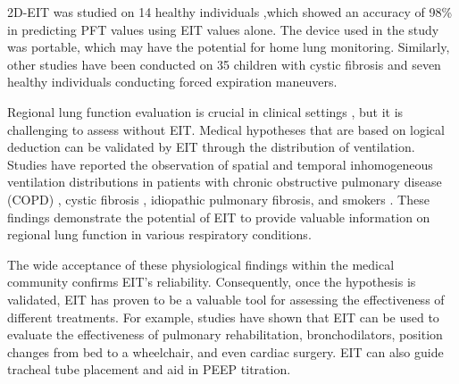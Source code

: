 \documentclass[journal,twoside,web]{ieeecolor}
\begin{document}
2D-EIT was studied on 14 healthy individuals \cite{9871104},which showed an accuracy of 98\% in predicting PFT values using EIT values alone. The device used in the study was portable, which may have the potential for home lung monitoring. Similarly, other studies have been conducted on 35 children with cystic fibrosis\cite{muller2018evaluation} and seven healthy individuals conducting forced expiration maneuvers\cite{ngo2016linearity}.

Regional lung function evaluation is crucial in clinical settings \cite{dubsky2015imaging}, but it is challenging to assess without EIT. Medical hypotheses that are based on logical deduction can be validated by EIT through the distribution of ventilation. Studies have reported the observation of spatial and temporal inhomogeneous ventilation distributions in patients with chronic obstructive pulmonary disease (COPD) \cite{lasarow2021regional,frerichs2021spatial,vogt2016regional,vogt2012spatial}, cystic fibrosis \cite{lehmann2016global}, idiopathic pulmonary fibrosis\cite{krauss2021evaluation}, and smokers  \cite{vogt2019regional}. These findings demonstrate the potential of EIT to provide valuable information on regional lung function in various respiratory conditions.

The wide acceptance of these physiological findings within the medical community confirms EIT's reliability. Consequently, once the hypothesis is validated, EIT has proven to be a valuable tool for assessing the effectiveness of different treatments. For example, studies have shown that EIT can be used to evaluate the effectiveness of pulmonary rehabilitation\cite{ma2022pulmonary, eimer2021effect}, bronchodilators\cite{frerichs2016regional}, position changes from bed to a wheelchair\cite{yuan2021effect}, and even cardiac surgery\cite{krause2014monitoring}. EIT can also guide tracheal tube placement\cite{lumb2018observational,lumb2020effects} and aid in PEEP titration\cite{ren2022comparison}.
\end{document}
